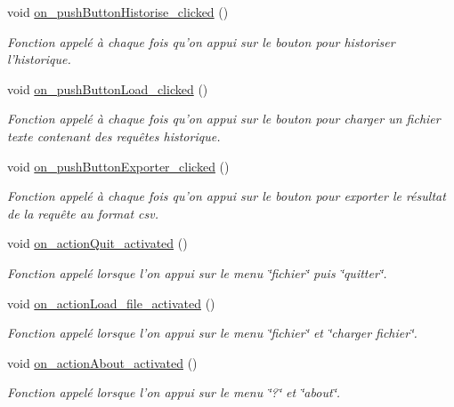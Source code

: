 \begin{DoxyCompactItemize}
void \hyperlink{class_main_window_a069692785eba48404e4b4a4f941723b8}{on\-\_\-push\-Button\-Historise\-\_\-clicked} ()
\begin{DoxyCompactList}\small\item\em Fonction appelé à chaque fois qu'on appui sur le bouton pour historiser l'historique. \end{DoxyCompactList}\item 
void \hyperlink{class_main_window_a56eeb1c63bd7618baf7415512fdff95a}{on\-\_\-push\-Button\-Load\-\_\-clicked} ()
\begin{DoxyCompactList}\small\item\em Fonction appelé à chaque fois qu'on appui sur le bouton pour charger un fichier texte contenant des requêtes historique. \end{DoxyCompactList}\item 
void \hyperlink{class_main_window_a79371134c204c9a3b659189024dee98f}{on\-\_\-push\-Button\-Exporter\-\_\-clicked} ()
\begin{DoxyCompactList}\small\item\em Fonction appelé à chaque fois qu'on appui sur le bouton pour exporter le résultat de la requête au format csv. \end{DoxyCompactList}\item 
void \hyperlink{class_main_window_a69eaf67ee180f3eb08d857036554149c}{on\-\_\-action\-Quit\-\_\-activated} ()
\begin{DoxyCompactList}\small\item\em Fonction appelé lorsque l'on appui sur le menu \char`\"{}fichier\char`\"{} puis \char`\"{}quitter\char`\"{}. \end{DoxyCompactList}\item 
void \hyperlink{class_main_window_ad2ffc1d131818f51d02ceada725837fb}{on\-\_\-action\-Load\-\_\-file\-\_\-activated} ()
\begin{DoxyCompactList}\small\item\em Fonction appelé lorsque l'on appui sur le menu \char`\"{}fichier\char`\"{} et \char`\"{}charger fichier\char`\"{}. \end{DoxyCompactList}\item 
void \hyperlink{class_main_window_a916767c87c035594f3952e107c527a72}{on\-\_\-action\-About\-\_\-activated} ()
\begin{DoxyCompactList}\small\item\em Fonction appelé lorsque l'on appui sur le menu \char`\"{}?\char`\"{} et \char`\"{}about\char`\"{}. \end{DoxyCompactList}\end{DoxyCompactItemize}
